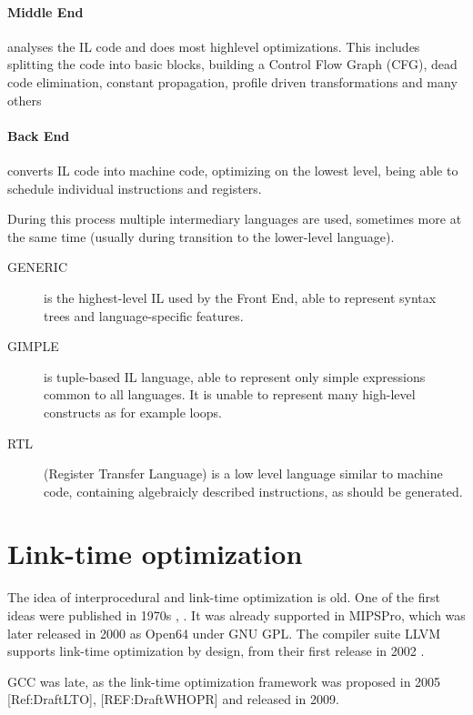 \paragraph{Middle End} analyses the IL code and does most highlevel
optimizations. This includes splitting the code into basic blocks, building a
Control Flow Graph (CFG), dead code elimination, constant propagation, profile
driven transformations and many others 

\paragraph{Back End} converts IL code into machine code, optimizing on the
lowest level, being able to schedule individual instructions and registers.

During this process multiple intermediary languages are used, sometimes more at
the same time (usually during transition to the lower-level language).

\begin{description}
	\item[GENERIC] is the highest-level IL used by the Front End, able to
		represent syntax trees and language-specific features.
	\item[GIMPLE] is tuple-based IL language, able to represent only simple
		expressions common to all languages. It is unable to represent many
		high-level constructs as for example loops.
	\item[RTL] (Register Transfer Language) is a low level language similar to
		machine code, containing algebraicly described instructions, as should
		be generated.
\end{description}


\section{Link-time optimization}

The idea of interprocedural and link-time optimization is old. One of the first ideas
were published in 1970s \cite{Allen1974}, \cite{Allen1976}. It was already supported
in MIPSPro, which was later released in 2000 as Open64 under GNU GPL. The
compiler suite LLVM supports link-time optimization by design, from their first
release in 2002 \cite{lattner2002llvm}.

GCC was late, as the link-time optimization framework was proposed in 2005
[Ref:DraftLTO], [REF:DraftWHOPR] and released in 2009.

